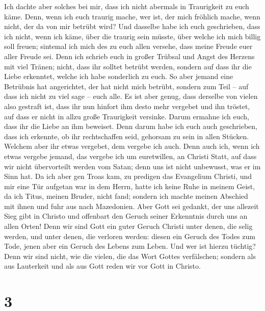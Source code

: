  Ich dachte aber solches bei mir, dass ich nicht abermals
in Traurigkeit zu euch käme.  Denn, wenn ich euch traurig
mache, wer ist, der mich fröhlich mache, wenn nicht, der da von mir
betrübt wird?  Und dasselbe habe ich euch geschrieben,
dass ich nicht, wenn ich käme, über die traurig sein müsste, über welche
ich mich billig soll freuen; sintemal ich mich des zu euch allen
versehe, dass meine Freude euer aller Freude sei.  Denn
ich schrieb euch in großer Trübsal und Angst des Herzens mit viel
Tränen; nicht, dass ihr solltet betrübt werden, sondern auf dass ihr die
Liebe erkenntet, welche ich habe sonderlich zu euch.  So
aber jemand eine Betrübnis hat angerichtet, der hat nicht mich betrübt,
sondern zum Teil -- auf dass ich nicht zu viel sage -- euch alle.
 Es ist aber genug, dass derselbe von vielen also gestraft
ist,  dass ihr nun hinfort ihm desto mehr vergebet und ihn
tröstet, auf dass er nicht in allzu große Traurigkeit versinke.
 Darum ermahne ich euch, dass ihr die Liebe an ihm
beweiset.  Denn darum habe ich euch auch geschrieben, dass
ich erkennte, ob ihr rechtschaffen seid, gehorsam zu sein in allen
Stücken.  Welchem aber ihr etwas vergebet, dem vergebe
ich auch. Denn auch ich, wenn ich etwas vergebe jemand, das vergebe ich
um euretwillen, an Christi Statt,  auf dass wir nicht
übervorteilt werden vom Satan; denn uns ist nicht unbewusst, was er im
Sinn hat.  Da ich aber gen Troas kam, zu predigen das
Evangelium Christi, und mir eine Tür aufgetan war in dem Herrn,
 hatte ich keine Ruhe in meinem Geist, da ich Titus,
meinen Bruder, nicht fand; sondern ich machte meinen Abschied mit ihnen
und fuhr aus nach Mazedonien.  Aber Gott sei gedankt, der
uns allezeit Sieg gibt in Christo und offenbart den Geruch seiner
Erkenntnis durch uns an allen Orten!  Denn wir sind Gott
ein guter Geruch Christi unter denen, die selig werden, und unter denen,
die verloren werden:  diesen ein Geruch des Todes zum
Tode, jenen aber ein Geruch des Lebens zum Leben. Und wer ist hierzu
tüchtig?  Denn wir sind nicht, wie die vielen, die das
Wort Gottes verfälschen; sondern als aus Lauterkeit und als aus Gott
reden wir vor Gott in Christo.

\hypertarget{section-2}{%
\section{3}\label{section-2}}

